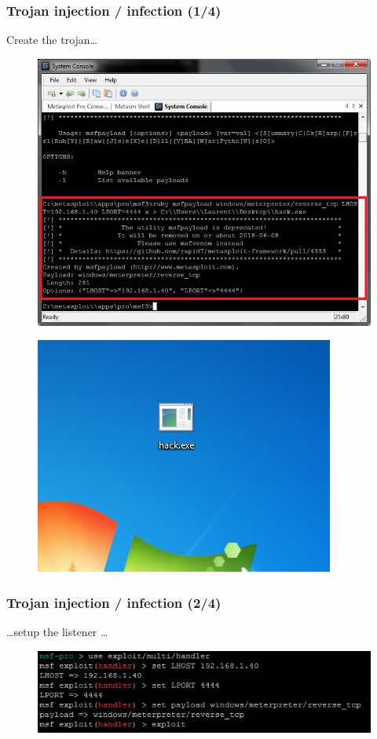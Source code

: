 \documentclass{beamer}
\begin{document}
\begin{frame}
\frametitle{Trojan injection / infection (1/4)}
Create the trojan\ldots
\begin{figure}
   \includegraphics[width= 0.5\linewidth]{../images/VM_Trojan_2.png}
\end{figure}
\begin{figure}
   \includegraphics[width= 0.3\linewidth]{../images/VM_Trojan_6.png}
\end{figure}
\end{frame}
\begin{frame}
\frametitle{Trojan injection / infection (2/4)}
\ldots setup the listener \ldots
\begin{figure}
   \includegraphics[width= 0.7\linewidth]{../images/VM_Trojan_3.png}
\end{figure}
\end{frame}
\end{document}
